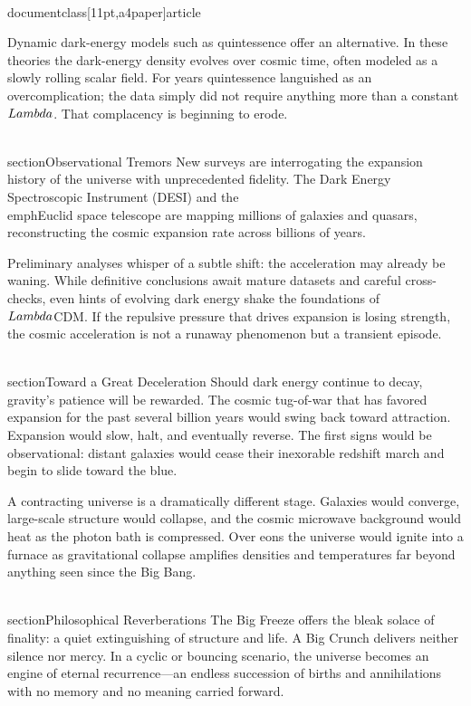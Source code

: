\\documentclass[11pt,a4paper]{article}
\begin{document}
Dynamic dark-energy models such as quintessence offer an alternative. In these theories the dark-energy density evolves over cosmic time, often modeled as a slowly rolling scalar field. For years quintessence languished as an overcomplication; the data simply did not require anything more than a constant \\$\\Lambda\\$. That complacency is beginning to erode.

\\section{Observational Tremors}
New surveys are interrogating the expansion history of the universe with unprecedented fidelity. The Dark Energy Spectroscopic Instrument (DESI) and the \\emph{Euclid} space telescope are mapping millions of galaxies and quasars, reconstructing the cosmic expansion rate across billions of years.

Preliminary analyses whisper of a subtle shift: the acceleration may already be waning. While definitive conclusions await mature datasets and careful cross-checks, even hints of evolving dark energy shake the foundations of \\$\\Lambda\\$CDM. If the repulsive pressure that drives expansion is losing strength, the cosmic acceleration is not a runaway phenomenon but a transient episode.

\\section{Toward a Great Deceleration}
Should dark energy continue to decay, gravity's patience will be rewarded. The cosmic tug-of-war that has favored expansion for the past several billion years would swing back toward attraction. Expansion would slow, halt, and eventually reverse. The first signs would be observational: distant galaxies would cease their inexorable redshift march and begin to slide toward the blue.

A contracting universe is a dramatically different stage. Galaxies would converge, large-scale structure would collapse, and the cosmic microwave background would heat as the photon bath is compressed. Over eons the universe would ignite into a furnace as gravitational collapse amplifies densities and temperatures far beyond anything seen since the Big Bang.

\\section{Philosophical Reverberations}
The Big Freeze offers the bleak solace of finality: a quiet extinguishing of structure and life. A Big Crunch delivers neither silence nor mercy. In a cyclic or bouncing scenario, the universe becomes an engine of eternal recurrence---an endless succession of births and annihilations with no memory and no meaning carried forward.
\end{document}
